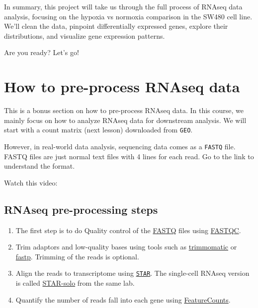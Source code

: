 \documentclass[
]{book}
\begin{document}
In summary, this project will take us through the full process of RNAseq data analysis, focusing on the hypoxia vs normoxia comparison in the SW480 cell line. We'll clean the data, pinpoint differentially expressed genes, explore their distributions, and visualize gene expression patterns.

Are you ready? Let's go!

\hypertarget{how-to-pre-process-rnaseq-data}{%
\section{How to pre-process RNAseq data}\label{how-to-pre-process-rnaseq-data}}

This is a bonus section on how to pre-process RNAseq data. In this course, we mainly focus on how to analyze RNAseq data for downstream analysis. We will start with a count matrix (next lesson) downloaded from \texttt{GEO}.

However, in real-world data analysis, sequencing data comes as a \texttt{FASTQ} file. FASTQ files are just normal text files with 4 lines for each read. Go to the link to understand the format.

Watch this video:

\hypertarget{rnaseq-pre-processing-steps}{%
\subsection{RNAseq pre-processing steps}\label{rnaseq-pre-processing-steps}}

\begin{enumerate}
\def\labelenumi{\arabic{enumi}.}
\item
  The first step is to do Quality control of the \href{https://en.wikipedia.org/wiki/FASTQ_format}{FASTQ} files using \href{https://www.bioinformatics.babraham.ac.uk/projects/fastqc/}{FASTQC}.
\item
  Trim adaptors and low-quality bases using tools such as \href{https://github.com/timflutre/trimmomatic}{trimmomatic} or \href{https://github.com/OpenGene/fastp}{fastp}. Trimming of the reads is optional.
\item
  Align the reads to transcriptome using \href{https://github.com/alexdobin/STAR}{\texttt{STAR}}. The single-cell RNAseq version is called \href{https://github.com/alexdobin/STAR/blob/master/docs/STARsolo.md}{STAR-solo} from the same lab.
\item
  Quantify the number of reads fall into each gene using \href{https://subread.sourceforge.net/}{FeatureCounts}.
\end{enumerate}
\end{document}
